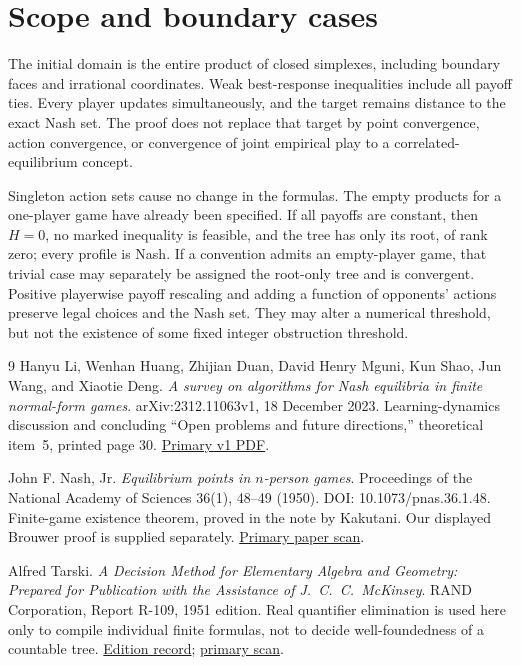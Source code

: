 \documentclass[11pt,a4paper]{article}
\theoremstyle{definition}
\begin{document}
\section{Scope and boundary cases}

The initial domain is the entire product of closed simplexes, including
boundary faces and irrational coordinates. Weak best-response inequalities
include all payoff ties. Every player updates simultaneously, and the
target remains distance to the exact Nash set. The proof does not replace
that target by point convergence, action convergence, or convergence of
joint empirical play to a correlated-equilibrium concept.

Singleton action sets cause no change in the formulas. The empty products
for a one-player game have already been specified. If all payoffs are
constant, then $H=0$, no marked inequality is feasible, and the tree has
only its root, of rank zero; every profile is Nash. If a convention admits
an empty-player game, that trivial case may separately be assigned the
root-only tree and is convergent. Positive playerwise payoff rescaling and
adding a function of opponents' actions preserve legal choices and the
Nash set. They may alter a numerical threshold, but not the existence of
some fixed integer obstruction threshold.

\begin{thebibliography}{9}
Hanyu Li, Wenhan Huang, Zhijian Duan, David Henry Mguni, Kun Shao,
Jun Wang, and Xiaotie Deng.
\emph{A survey on algorithms for Nash equilibria in finite normal-form
games}. arXiv:2312.11063v1, 18 December 2023.
Learning-dynamics discussion and concluding ``Open problems and future
directions,'' theoretical item~5, printed page 30.
\href{https://arxiv.org/pdf/2312.11063v1}{Primary v1 PDF}.

John F. Nash, Jr.
\emph{Equilibrium points in $n$-person games}.
Proceedings of the National Academy of Sciences 36(1), 48--49 (1950).
DOI: 10.1073/pnas.36.1.48. Finite-game existence theorem, proved in the
note by Kakutani. Our displayed Brouwer proof is supplied separately.
\href{https://pmc.ncbi.nlm.nih.gov/articles/PMC1063129/}{Primary paper scan}.

Alfred Tarski.
\emph{A Decision Method for Elementary Algebra and Geometry:
Prepared for Publication with the Assistance of J.~C.~C.~McKinsey}.
RAND Corporation, Report R-109, 1951 edition.
Real quantifier elimination is used here only to compile individual finite
formulas, not to decide well-foundedness of a countable tree.
\href{https://www.rand.org/pubs/reports/R109.html}{Edition record}; \href{https://www.rand.org/content/dam/rand/pubs/reports/2008/R109.pdf}{primary scan}.
\end{thebibliography}
\end{document}
